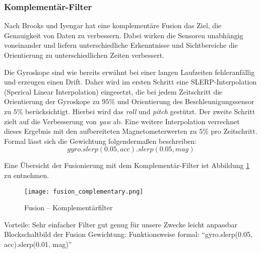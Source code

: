 \subsubsection{Komplementär-Filter}
Nach Brooks und Iyengar \cite{}  hat eine komplementäre Fusion das Ziel, die Genauigkeit von Daten zu verbessern. 
Dabei wirken die Sensoren unabhängig voneinander und liefern unterschiedliche Erkenntnisse und Sichtbereiche die Orientierung zu unterschiedlichen Zeiten verbessert.

Die Gyroskope sind wie bereits erwähnt bei einer langen Laufzeiten fehleranfällig und erzeugen einen Drift. 
Daher wird im ersten Schritt eine SLERP-Interpolation (Sperical Linear Interpolation) eingesetzt, die bei jedem Zeitschritt die Orientierung der Gyroskope zu $95\%$ und Orientierung des Beschleunigungssensor zu $5\%$ berücksichtigt. Hierbei wird das \emph{roll} und \emph{pitch} gestützt. Der zweite Schritt zielt auf die Verbesserung von \emph{yaw} ab. Eine weitere Interpolation verrechnet dieses Ergebnis mit den aufbereiteten Magnetometerwerten zu $5\%$ pro Zeitschritt. Formal lässt sich die Gewichtung folgendermaßen beschreiben:
\begin{equation}
    gyro.slerp(0.05, acc).slerp(0.05, mag)
\end{equation}


Eine Übersicht der Fusionierung mit dem Komplementär-Filter ist Abbildung \ref{fig:fusion_complementary} zu entnehmen.

\begin{figure}[ht]
   \centering
   \texttt{[image: fusion\_complementary.png]}
   \caption[]{Fusion -- Komplementärfilter}
   \label{fig:fusion_complementary}
\end{figure}


Vorteile:
Sehr einfacher Filter
gut genug für unsere Zwecke
leicht anpassbar
Blockschaltbild der Fusion
Gewichtung: Funktionsweise formal: “gyro.slerp(0.05, acc).slerp(0.01, mag)”


